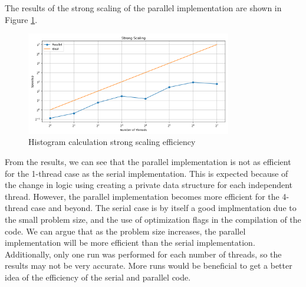 \documentclass[unicode,11pt,a4paper,oneside,numbers=endperiod,openany]{scrartcl}
\begin{document}
The results of the strong scaling of the parallel implementation are shown in
Figure \ref{fig:histogram-strong-scaling}.
\begin{figure}[h]
  \centering
  \includegraphics[width=0.8\textwidth]{../hist/strong_scaling_plot.png}
  \caption{Histogram calculation strong scaling efficiency}
  \label{fig:histogram-strong-scaling}
\end{figure}
From the results, we can see that the parallel implementation is not as
efficient for the 1-thread case as the serial implementation. This is expected
because of the change in logic using creating a private data structure for each
independent thread. However, the parallel implementation
becomes more efficient for the 4-thread case and beyond. The serial
case is by itself a good implmentation due to the small problem size, and the
use of optimization flags in the compilation of the code. We can argue that as
the problem size increases, the parallel implementation will be more efficient
than the serial implementation. Additionally, only one run was performed for
each number of threads, so the results may not be very accurate. More runs would
be beneficial to get a better idea of the efficiency of the serial and parallel code.
\end{document}
